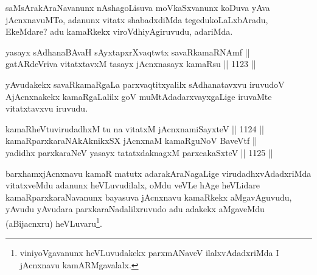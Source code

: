 \begin{artha}
saMsArakAraNavanunx nAshagoLisuva moVkaSxvanunx koDuva yAva jAcnxnavuMTo, adanunx vitatx shabadxdiMda tegedukoLaLxbAradu, EkeMdare? adu kamaRkekx viroVdhiyAgiruvudu, adariMda.
\end{artha}


\begin{shl}
yasayx sAdhanaBAvaH sAyxtapxrXvaqtwtx savaRkamaRNAmf || \\
\footnotemark[1]gatARdeVriva vitatxtavxM tasayx jAcnxnasayx kamaRsu \hfill || 1123 ||  
\end{shl}

\begin{artha}
yAvudakekx savaRkamaRgaLa parxvaqtitxyalilx sAdhanatavxvu iruvudoV AjAcnxnakekx kamaRgaLalilx goV muMtAdadarxvayxgaLige iruvaMte vitatxtavxvu iruvudu.
\end{artha}


\begin{shl}
kamaRheVtuvirudadhxM tu na vitatxM jAcnxnamiSayxteV \hfill || 1124 ||  \\
kamaRparxkaraNAkAknikxSX jAcnxnaM kamaRguNoV BaveVtf || \\
yadidhx parxkaraNeV yasayx tatatxdaknagxM parxcakaSxteV \hfill || 1125 || 
\end{shl}

\begin{artha}
barxhamxjAcnxnavu kamaR matutx adarakAraNagaLige virudadhxvAdadxriMda vitatxveMdu adanunx heVLuvudilalx, oMdu veVLe hAge heVLidare kamaRparxkaraNavanunx bayasuva jAcnxnavu kamaRkekx aMgavAguvudu, yAvudu yAvudara parxkaraNadalilxruvudo adu adakekx aMgaveMdu (aBijacnxru) heVLuvaru\footnote{viniyoVgavanunx heVLuvudakekx parxmANaveV ilalxvAdadxriMda I jAcnxnavu kamARMgavalalx.}.
\end{artha}


